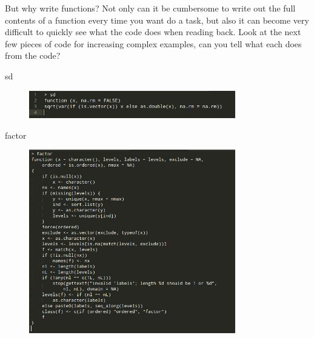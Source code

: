 \documentclass{beamer}\usepackage[]{graphicx}\usepackage[]{color}
\begin{document}
\begin{frame}[fragile]{But why write functions?}
Not only can it be cumbersome to write out the full contents of a function every time you want do a task, but also it can become very difficult to quickly see what the code does when reading back.
\linebreak
\linebreak
Look at the next few pieces of code for increasing complex examples, can you tell what each does from the code?

\end{frame}


\begin{frame}[fragile]{sd}
\begin{figure}[ht!]
\centering
\includegraphics[width=90mm]{pictures/sd.png}
\label{overflow}
\end{figure}
\end{frame}


\begin{frame}[fragile]{factor}
\begin{figure}[ht!]
\centering
\includegraphics[width=90mm]{pictures/factor.png}
\label{overflow}
\end{figure}
\end{frame}
\end{document}
